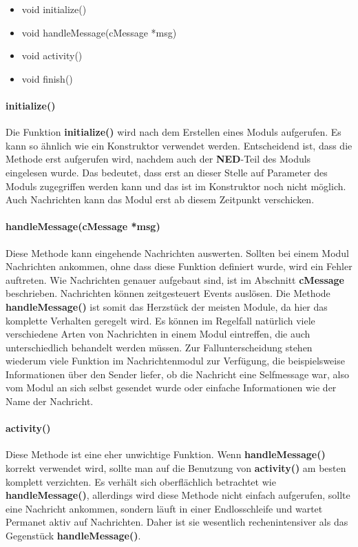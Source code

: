 \begin{itemize}
\item void initialize()
\item void handleMessage(cMessage *msg)
\item void activity()
\item void finish()
\end{itemize}

\paragraph{initialize()}

Die Funktion \textbf{initialize()} wird nach dem Erstellen eines Moduls aufgerufen. Es kann so ähnlich wie ein Konstruktor verwendet werden. Entscheidend ist, dass die Methode erst aufgerufen wird, nachdem auch der \textbf{NED}-Teil des Moduls eingelesen wurde. Das bedeutet, dass erst an dieser Stelle auf Parameter des Moduls zugegriffen werden kann und das ist im Konstruktor noch nicht möglich. Auch Nachrichten kann das Modul erst ab diesem Zeitpunkt verschicken.

\paragraph{handleMessage(cMessage *msg)}

Diese Methode kann eingehende Nachrichten auswerten. Sollten bei einem Modul Nachrichten ankommen, ohne dass diese Funktion definiert wurde, wird ein Fehler auftreten. Wie Nachrichten genauer aufgebaut sind, ist im Abschnitt \textbf{cMessage} beschrieben.
Nachrichten können zeitgesteuert Events auslösen. Die Methode \textbf{handleMessage()} ist somit das Herzstück der meisten Module, da hier das komplette Verhalten geregelt wird. \newline
Es können im Regelfall natürlich viele verschiedene Arten von Nachrichten in einem Modul eintreffen, die auch unterschiedlich behandelt werden müssen. Zur Fallunterscheidung stehen wiederum viele Funktion im Nachrichtenmodul zur Verfügung, die beispielsweise Informationen über den Sender liefer, ob die Nachricht eine Selfmessage war, also vom Modul an sich selbst gesendet wurde oder einfache Informationen wie der Name der Nachricht.

\paragraph{activity()}

Diese Methode ist eine eher unwichtige Funktion. Wenn \textbf{handleMessage()} korrekt verwendet wird, sollte man auf die Benutzung von \textbf{activity()} am besten komplett verzichten. Es verhält sich oberflächlich betrachtet wie \textbf{handleMessage()}, allerdings wird diese Methode nicht einfach aufgerufen, sollte eine Nachricht ankommen, sondern läuft in einer Endlosschleife und wartet Permanet aktiv auf Nachrichten. Daher ist sie wesentlich rechenintensiver als das Gegenstück \textbf{handleMessage()}.

